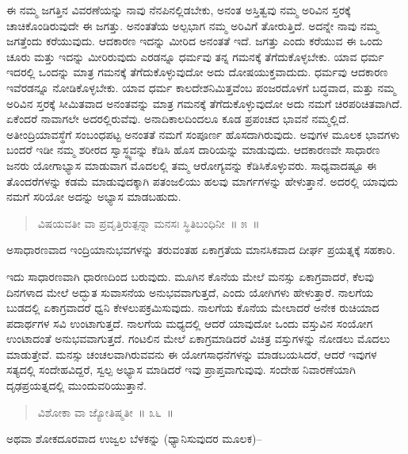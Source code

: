 ಈ ನಮ್ಮ ಜಗತ್ತಿನ ವಿವರಣೆಯನ್ನು ನಾವು ನೆನಪಿನಲ್ಲಿಡಬೇಕು, ಅನಂತ ಅಸ್ತಿತ್ವವು ನಮ್ಮ ಅರಿವಿನ ಸ್ತರಕ್ಕೆ ಚಾಚಿಕೊಂಡಿರುವುದೇ ಈ ಜಗತ್ತು. ಅನಂತತೆಯ ಅಲ್ಪಭಾಗ ನಮ್ಮ ಅರಿವಿಗೆ ತೋರುತ್ತಿದೆ. ಅದನ್ನೇ ನಾವು ನಮ್ಮ ಜಗತ್ತೆಂದು ಕರೆಯುವುದು. ಆದಕಾರಣ ಇದನ್ನು ಮೀರಿದ ಅನಂತತೆ ಇದೆ. ಜಗತ್ತು ಎಂದು ಕರೆಯುವ ಈ ಒಂದು ಚೂರು ಮತ್ತು ಇದನ್ನು ಮೀರಿರುವುದು ಎರಡನ್ನೂ ಧರ್ಮವು ತನ್ನ ಗಮನಕ್ಕೆ ತೆಗೆದುಕೊಳ್ಳಬೇಕು. ಯಾವ ಧರ್ಮ ಇದರಲ್ಲಿ ಒಂದನ್ನು ಮಾತ್ರ ಗಮನಕ್ಕೆ ತೆಗೆದುಕೊಳ್ಳುವುದೋ ಅದು ದೋಷಯುಕ್ತವಾದುದು. ಧರ್ಮವು ಆದಕಾರಣ ಇವೆರಡನ್ನೂ ನೋಡಿಕೊಳ್ಳಬೇಕು. ಯಾವ ಧರ್ಮ ಕಾಲದೇಶನಿಮಿತ್ತವೆಂಬ ಪಂಜರದೊಳಗೆ ಬದ್ಧವಾದ, ಮತ್ತು ನಮ್ಮ ಅರಿವಿನ ಸ್ತರಕ್ಕೆ ಸೀಮಿತವಾದ ಅನಂತವನ್ನು ಮಾತ್ರ ಗಮನಕ್ಕೆ ತೆಗೆದುಕೊಳ್ಳುವುದೋ ಅದು ನಮಗೆ ಚಿರಪರಿಚಿತವಾಗಿದೆ. ಏಕೆಂದರೆ ನಾವಾಗಲೇ ಅದರಲ್ಲಿರುವೆವು. ಅನಾದಿಕಾಲದಿಂದಲೂ ಕೂಡ ಪ್ರಪಂಚದ ಭಾವನೆ ನಮ್ಮಲ್ಲಿದೆ. ಅತೀಂದ್ರಿಯಾವಸ್ಥೆಗೆ ಸಂಬಂಧಪಟ್ಟ ಅನಂತತೆ ನಮಗೆ ಸಂಪೂರ್ಣ ಹೊಸದಾಗಿರುವುದು. ಅವುಗಳ ಮೂಲಕ ಭಾವಗಳು ಬಂದರೆ ಇಡೀ ನಮ್ಮ ಶರೀರದ ಸ್ವಾಸ್ಥ್ಯವನ್ನು ಕೆಡಿಸಿ ಹೊಸ ದಾರಿಯನ್ನು ಮಾಡುವುದು. ಆದಕಾರಣವೇ ಸಾಧಾರಣ ಜನರು ಯೋಗಾಭ್ಯಾಸ ಮಾಡುವಾಗ ಮೊದಲಲ್ಲಿ ತಮ್ಮ ಆರೋಗ್ಯವನ್ನು ಕೆಡಿಸಿಕೊಳ್ಳುವರು. ಸಾಧ್ಯವಾದಷ್ಟೂ ಈ ತೊಂದರೆಗಳನ್ನು ಕಡಮೆ ಮಾಡುವುದಕ್ಕಾಗಿ ಪತಂಜಲಿಯು ಹಲವು ಮಾರ್ಗಗಳನ್ನು ಹೇಳುತ್ತಾನೆ. ಅದರಲ್ಲಿ ಯಾವುದು ನಮಗೆ ಸರಿಯೋ ಅದನ್ನು ಅಭ್ಯಾಸ ಮಾಡಬಹುದು. 

\vspace{-0.3cm}

\begin{verse}
ವಿಷಯವತೀ ವಾ ಪ್ರವೃತ್ತಿರುತ್ಪನ್ನಾ ಮನಸಃ ಸ್ಥಿತಿಬಂಧಿನೀ~॥ ೫~॥
\end{verse}

\vspace{-0.3cm}

ಅಸಾಧಾರಣವಾದ ಇಂದ್ರಿಯಾನುಭವಗಳನ್ನು ತರುವಂತಹ ಏಕಾಗ್ರತೆಯ ಮಾನಸಿಕವಾದ ದೀರ್ಘ ಪ್ರಯತ್ನಕ್ಕೆ ಸಹಕಾರಿ. 

ಇದು ಸಾಧಾರಣವಾಗಿ ಧಾರಣದಿಂದ ಬರುವುದು. ಮೂಗಿನ ಕೊನೆಯ ಮೇಲೆ ಮನಸ್ಸು ಏಕಾಗ್ರವಾದರೆ, ಕೆಲವು ದಿನಗಳಾದ ಮೇಲೆ ಅದ್ಭುತ ಸುವಾಸನೆಯ ಅನುಭವವಾಗುತ್ತದೆ, ಎಂದು ಯೋಗಿಗಳು ಹೇಳುತ್ತಾರೆ. ನಾಲಗೆಯ ಬುಡದಲ್ಲಿ ಏಕಾಗ್ರವಾದರೆ ಧ್ವನಿ ಕೇಳಲುಪಕ್ರಮಿಸುವುದು. ನಾಲಗೆಯ ಕೊನೆಯ ಮೇಲಾದರೆ ಅನೇಕ ರುಚಿಯಾದ ಪದಾರ್ಥಗಳ ಸವಿ ಉಂಟಾಗುತ್ತದೆ. ನಾಲಗೆಯ ಮಧ್ಯದಲ್ಲಿ ಆದರೆ ಯಾವುದೋ ಒಂದು ವಸ್ತುವಿನ ಸಂಯೋಗ ಉಂಟಾದಂತೆ ಅನುಭವವಾಗುತ್ತದೆ. ಗಂಟಲಿನ ಮೇಲೆ ಏಕಾಗ್ರಮಾಡಿದರೆ ವಿಚಿತ್ರ ವಸ್ತುಗಳನ್ನು ನೋಡಲು ಮೊದಲು ಮಾಡುತ್ತೇವೆ. ಮನಸ್ಸು ಚಂಚಲವಾಗಿರುವವನು ಈ ಯೋಗಸಾಧನೆಗಳನ್ನು ಮಾಡಬಯಸಿದರೆ, ಆದರೆ ಇವುಗಳ ಸತ್ಯದಲ್ಲಿ ಸಂದೇಹವಿದ್ದರೆ, ಸ್ವಲ್ಪ ಅಭ್ಯಾಸ ಮಾಡಿದರೆ ಇವು ಪ್ರಾಪ್ತವಾಗುವುವು. ಸಂದೇಹ ನಿವಾರಣೆಯಾಗಿ ದೃಢಪ್ರಯತ್ನದಲ್ಲಿ ಮುಂದುವರಿಯುತ್ತಾನೆ. 

\vspace{-0.3cm}

\begin{verse}
ವಿಶೋಕಾ ವಾ ಜ್ಯೋತಿಷ್ಮತೀ~॥ ೩೬~॥
\end{verse}

\vspace{-0.3cm}

ಅಥವಾ ಶೋಕದೂರವಾದ ಉಜ್ವಲ ಬೆಳಕನ್ನು (ಧ್ಯಾನಿಸುವುದರ ಮೂಲಕ)–

